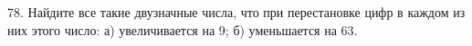 78. Найдите все такие двузначные числа, что при перестановке цифр в каждом из них этого число: а) увеличивается на 9; б) уменьшается на 63.\\
